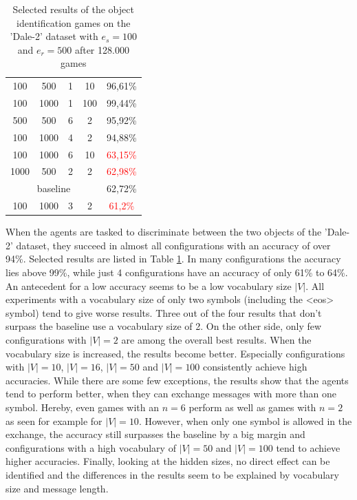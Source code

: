 \begin{table}[ht]
\begin{tabular}{cccc|c}
        {100}                         & {500}     & {1} & {10}  & {96,61\%}                           \\
        {100}                         & {1000}    & {1} & {100} & {99,44\%}                           \\
        {500}                         & {500}     & {6} & {2}   & {95,92\%}                           \\
        {100}                         & {1000}    & {4} & {2}   & {94,88\%}                           \\
        {100}                         & {1000}    & {6} & {10}  & \textcolor{red}{63,15\%}            \\
        {1000}                        & {500}     & {2} & {2}   & \textcolor{red}{62,98\%}            \\\midrule
        \multicolumn{4}{c|}{baseline} & {62,72\%}                                                     \\\midrule
        {100}                         & {1000}    & {3} & {2}   & \textcolor{red}{61,2\%}             \\
        \bottomrule
    \end{tabular}
    \caption{Selected results of the object identification games on the 'Dale-2' dataset with $e_s=100$ and $e_r=500$ after 128.000 games}
    \label{tab:results_discriminator_dale-2}
\end{table}

When the agents are tasked to discriminate between the two objects of the 'Dale-2' dataset, they succeed in almost all configurations with an accuracy of over 94\%.
Selected results are listed in Table \ref{tab:results_discriminator_dale-2}.
In many configurations the accuracy lies above 99\%, while just 4 configurations have an accuracy of only 61\% to 64\%.
An antecedent for a low accuracy seems to be a low vocabulary size $|V|$.
All experiments with a vocabulary size of only two symbols (including the <eos> symbol) tend to give worse results.
Three out of the four results that don't surpass the baseline use a vocabulary size of 2.
On the other side, only few configurations with $|V| = 2$ are among the overall best results.
When the vocabulary size is increased, the results become better.
Especially configurations with $|V| = 10$, $|V| = 16$, $|V| = 50$ and $|V| = 100$ consistently achieve high accuracies.
While there are some few exceptions, the results show that the agents tend to perform better, when they can exchange messages with more than one symbol.
Hereby, even games with an $n = 6$ perform as well as games with $n = 2$ as seen for example for $|V| = 10$.
However, when only one symbol is allowed in the exchange, the accuracy still surpasses the baseline by a big margin and configurations with a high vocabulary of $|V| = 50$ and $|V| = 100$ tend to achieve higher accuracies.
Finally, looking at the hidden sizes, no direct effect can be identified and the differences in the results seem to be explained by vocabulary size and message length.

